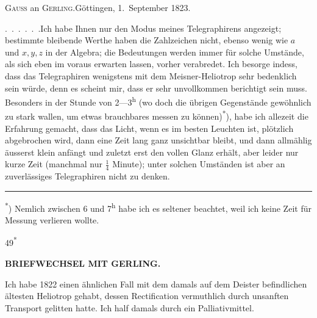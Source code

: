 \begingroup
\newcommand{\GerlingSeptSeconds}[2]{#1\makebox[.42em][c]{,\makebox[0pt][r]{\textsuperscript{s}}}#2}
\begin{center}
\textsc{Gauss} an \textsc{Gerling}.\quad Göttingen, 1.~September 1823.
\end{center}

\par\noindent\hspace*{\parindent}\mbox{.\ .\ .\ .\ .\ .\quad Ich} habe Ihnen nur den Modus meines Telegraphirens angezeigt; bestimmte bleibende Werthe haben die Zahlzeichen nicht, ebenso wenig wie \(a\) und \(x,y,z\) in der Algebra; die Bedeutungen werden immer für solche Umstände, als sich eben im voraus erwarten lassen, vorher verabredet.
Ich besorge indess, dass das Telegraphiren wenigstens mit dem Meisner-Heliotrop sehr bedenklich sein würde, denn es scheint mir, dass er sehr unvollkommen berichtigt sein muss.
Besonders in der Stunde von 2---3\textsuperscript{h} (wo doch die übrigen Gegenstände gewöhnlich zu stark wallen, um etwas brauchbares messen zu können)\textsuperscript{*}), habe ich allezeit die Erfahrung gemacht, dass das Licht, wenn es im besten Leuchten ist, plötzlich abgebrochen wird, dann eine Zeit lang ganz unsichtbar bleibt, und dann allmählig äusserst klein anfängt und zuletzt erst den vollen Glanz erhält, aber leider nur kurze Zeit  (manchmal nur \(\frac{1}{4}\) Minute); unter solchen Umständen ist aber an zuverlässiges Telegraphiren nicht zu denken.
\par\smallskip\noindent\rule{.24\linewidth}{.4pt}\par\nobreak
{\footnotesize\noindent\hspace*{\parindent}\textsuperscript{*}) Nemlich zwischen 6 und 7\textsuperscript{h} habe ich es seltener beachtet, weil ich keine Zeit für Messung verlieren wollte.\par}
\smallskip\noindent\hfill{\small49\textsuperscript{*}}\hspace*{.123\linewidth}\par
\clearpage
\noindent{}\hfill{\small\textbf{BRIEFWECHSEL MIT GERLING.}}\hfill\null\par\medskip
\par\noindent\hspace*{\parindent}Ich habe 1822 einen ähnlichen Fall mit dem damals auf dem Deister befindlichen ältesten Heliotrop gehabt, dessen Rectification vermuthlich durch unsanften Transport gelitten hatte.
Ich half damals durch ein Palliativmittel.
